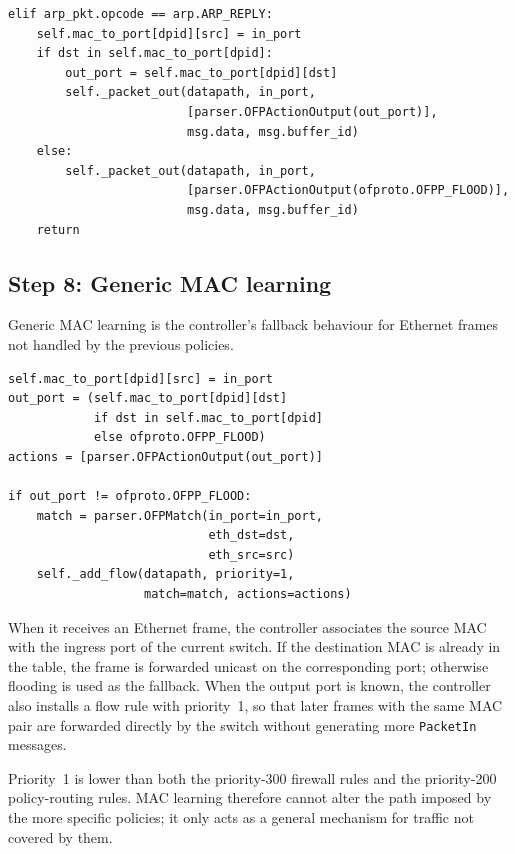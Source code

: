 \documentclass[11pt,a4paper]{article}
\newcommand{\code}[1]{\texttt{#1}}
\begin{document}
\begin{lstlisting}[style=py,caption={Forwarding an ARP reply}]
elif arp_pkt.opcode == arp.ARP_REPLY:
    self.mac_to_port[dpid][src] = in_port
    if dst in self.mac_to_port[dpid]:
        out_port = self.mac_to_port[dpid][dst]
        self._packet_out(datapath, in_port,
                         [parser.OFPActionOutput(out_port)],
                         msg.data, msg.buffer_id)
    else:
        self._packet_out(datapath, in_port,
                         [parser.OFPActionOutput(ofproto.OFPP_FLOOD)],
                         msg.data, msg.buffer_id)
    return
\end{lstlisting}

\subsection{Step 8: Generic MAC learning}
Generic MAC learning is the controller's fallback behaviour for Ethernet frames
not handled by the previous policies.

\begin{lstlisting}[style=py,caption={Generic MAC learning}]
self.mac_to_port[dpid][src] = in_port
out_port = (self.mac_to_port[dpid][dst]
            if dst in self.mac_to_port[dpid]
            else ofproto.OFPP_FLOOD)
actions = [parser.OFPActionOutput(out_port)]

if out_port != ofproto.OFPP_FLOOD:
    match = parser.OFPMatch(in_port=in_port,
                            eth_dst=dst,
                            eth_src=src)
    self._add_flow(datapath, priority=1,
                   match=match, actions=actions)
\end{lstlisting}

When it receives an Ethernet frame, the controller associates the source MAC
with the ingress port of the current switch. If the destination MAC is already
in the table, the frame is forwarded unicast on the corresponding port;
otherwise flooding is used as the fallback. When the output port is known, the
controller also installs a flow rule with priority~1, so that later frames with
the same MAC pair are forwarded directly by the switch without generating more
\code{PacketIn} messages.

Priority~1 is lower than both the priority-300 firewall rules and the
priority-200 policy-routing rules. MAC learning therefore cannot alter the path
imposed by the more specific policies; it only acts as a general mechanism for
traffic not covered by them.
\end{document}
